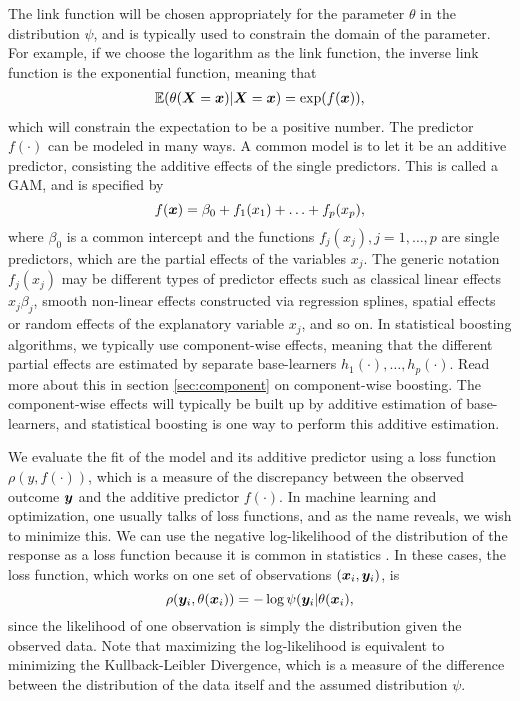 The link function will be chosen appropriately for the parameter $\theta$ in the distribution $\psi$, and is typically used to constrain the domain of the parameter.
For example, if we choose the logarithm as the link function, the inverse link function is the exponential function, meaning that
\begin{align}
    \mathbb{E}(\theta(\bm{X}=\bm{x})|\bm{X}=\bm{x})=\exp(f(\bm{x})),
\end{align}
which will constrain the expectation to be a positive number.
The predictor $f(\cdot)$ can be modeled in many ways.
A common model is to let it be an additive predictor, consisting the additive effects of the single predictors.
This is called a GAM, and is specified by
\begin{equation}\label{eq:gam}
    f(\bm{x})=\beta_0+f_1(x_1)+\ldots+f_p(x_p),
\end{equation}
where $\beta_0$ is a common intercept and the functions $f_j(x_j),j=1,\ldots,p$ are single predictors, which are the partial effects of the variables $x_j$.
The generic notation $f_j(x_j)$ may be different types of predictor effects such as classical linear effects $x_j\beta_j$, smooth non-linear effects constructed via regression splines, spatial effects or random effects of the explanatory variable $x_j$, and so on.%
In statistical boosting algorithms, we typically use component-wise effects, meaning that the different partial effects are estimated by separate base-learners $h_1(\cdot),\ldots,h_p(\cdot)$. Read more about this in section \ref{sec:component} on component-wise boosting. The component-wise effects will typically be built up by additive estimation of base-learners, and statistical boosting is one way to perform this additive estimation.

We evaluate the fit of the model and its additive predictor using a loss function $\rho(y,f(\cdot))$, which is a measure of the discrepancy between the observed outcome $\bm{y}$ and the additive predictor $f(\cdot)$.
In machine learning and optimization, one usually talks of loss functions, and as the name reveals, we wish to minimize this.
We can use the negative log-likelihood of the distribution of the response as a loss function because it is common in statistics \citep{mayr14a}. In these cases, the loss function, which works on one set of observations $(\bm{x}_i,\bm{y}_i)$, is
\begin{equation}
    \rho(\bm{y}_i,\theta(\bm{x}_i))=-\log{\psi(\bm{y}_i|\theta(\bm{x}_i)},
\end{equation}
since the likelihood of one observation is simply the distribution given the observed data.
Note that maximizing the log-likelihood is equivalent to minimizing the Kullback-Leibler Divergence, which is a measure of the difference between the distribution of the data itself and the assumed distribution $\psi$.

